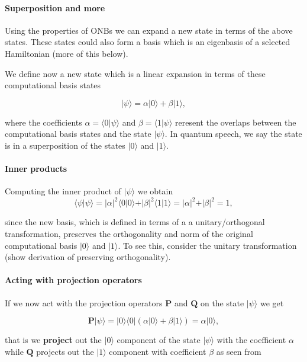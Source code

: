 \paragraph{Superposition and more}

Using the properties of ONBs we can expand a new state in terms of the
above states. These states could also form  a basis which is an
eigenbasis of a selected Hamiltonian (more of this below).

We define now a new state which is a linear expansion in terms of
these computational basis states

\[
\vert \psi \rangle = \alpha \vert 0 \rangle + \beta\vert 1 \rangle,
\]

where the coefficients $\alpha = \langle 0 \vert \psi \rangle$ and
$\beta =\langle 1 \vert \psi\rangle$ reresent the overlaps between the
computational basis states and the state $\vert \psi\rangle$. In quantum speech, we say the state is in a superposition of the states $\vert 0\rangle$ and $\vert 1\rangle$.


\paragraph{Inner products}
Computing the inner product of $\vert \psi \rangle$ we obtain
\[
\langle \psi \vert \psi \rangle = \vert \alpha \vert ^2\langle 0\vert 0\rangle + \vert \beta \vert ^2\langle 1\vert 1\rangle = \vert \alpha \vert ^2 + \vert \beta \vert ^2 = 1,
\]

since the new basis, which is defined in terms of a a unitary/orthogonal
transformation, preserves the orthogonality and norm of the original
computational basis $\vert 0\rangle$ and $\vert 1\rangle$. To see
this, consider the unitary transformation (show derivation of
preserving orthogonality).


\paragraph{Acting with projection operators}

If we now act with the projection operators $\bm{P}$ and $\bm{Q}$ on
the state $\vert \psi\rangle$ we get

\[
\bm{P}\vert \psi \rangle = \vert 0 \rangle\langle 0\vert (\alpha \vert 0 \rangle + \beta\vert 1 \rangle)=\alpha \vert 0\rangle,
\]

that is we \textbf{project} out the $\vert 0\rangle$ component of the state
$\vert \psi\rangle$ with the coefficient $\alpha$ while $\bm{Q}$
projects out the $\vert 1\rangle$ component with coefficient $\beta$
as seen from

